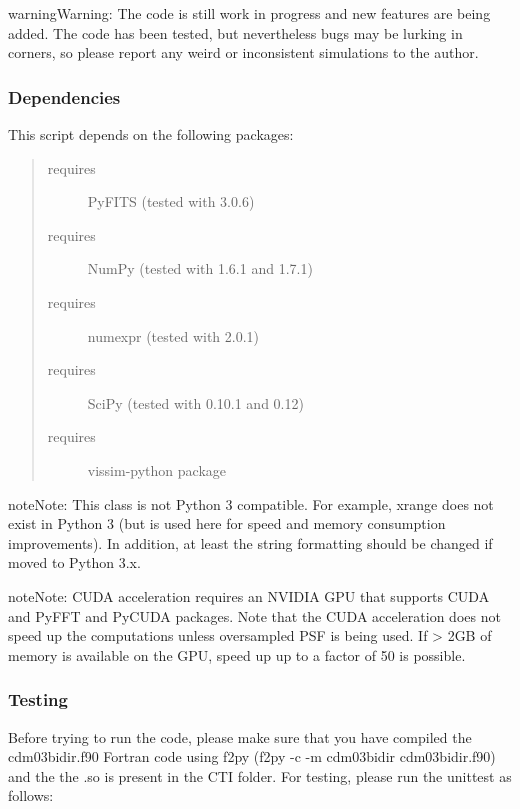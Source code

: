 \documentclass[a4paper,11pt,english]{sphinxmanual}
\begin{document}
\begin{notice}{warning}{Warning:}
The code is still work in progress and new features are being added.
The code has been tested, but nevertheless bugs may be lurking in corners, so
please report any weird or inconsistent simulations to the author.
\end{notice}


\subsubsection{Dependencies}
\label{simulator:dependencies}
This script depends on the following packages:
\begin{quote}\begin{description}
\item[{requires}] \leavevmode
PyFITS (tested with 3.0.6)

\item[{requires}] \leavevmode
NumPy (tested with 1.6.1 and 1.7.1)

\item[{requires}] \leavevmode
numexpr (tested with 2.0.1)

\item[{requires}] \leavevmode
SciPy (tested with 0.10.1 and 0.12)

\item[{requires}] \leavevmode
vissim-python package

\end{description}\end{quote}

\begin{notice}{note}{Note:}
This class is not Python 3 compatible. For example, xrange does not exist
in Python 3 (but is used here for speed and memory consumption improvements).
In addition, at least the string formatting should be changed if moved to
Python 3.x.
\end{notice}

\begin{notice}{note}{Note:}
CUDA acceleration requires an NVIDIA GPU that supports CUDA and PyFFT and PyCUDA packages.
Note that the CUDA acceleration does not speed up the computations unless oversampled PSF
is being used. If \textgreater{} 2GB of memory is available on the GPU, speed up up to a factor of 50 is
possible.
\end{notice}


\subsubsection{Testing}
\label{simulator:testing}
Before trying to run the code, please make sure that you have compiled the
cdm03bidir.f90 Fortran code using f2py (f2py -c -m cdm03bidir cdm03bidir.f90) and the the .so is present in
the CTI folder. For testing,
please run the unittest as follows:
\end{document}
